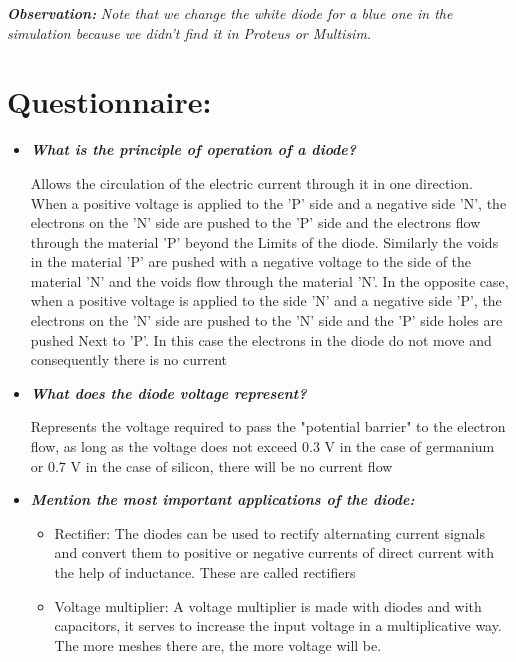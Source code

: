 \documentclass[10pt,a4paper]{article}
\begin{document}
{\bfseries\itshape Observation:} {\itshape Note that we change the white diode for a blue one in the simulation because we didn't find it in Proteus or Multisim.}

\pagebreak

\section{Questionnaire:}

\begin{itemize}
\item {\bfseries\itshape What is the principle of operation of a diode?}

Allows the circulation of the electric current through it in one direction.
When a positive voltage is applied to the 'P' side and a negative side 'N', the electrons on the 'N' side are pushed to the 'P' side and the electrons flow through the material 'P' beyond the Limits of the diode. Similarly the voids in the material 'P' are pushed with a negative voltage to the side of the material 'N' and the voids flow through the material 'N'. In the opposite case, when a positive voltage is applied to the side 'N' and a negative side 'P', the electrons on the 'N' side are pushed to the 'N' side and the 'P' side holes are pushed Next to 'P'. In this case the electrons in the diode do not move and consequently there is no current

\item {\bfseries\itshape What does the diode voltage represent?}

Represents the voltage required to pass the "potential barrier" to the electron flow, as long as the voltage does not exceed 0.3 V in the case of germanium or 0.7 V in the case of silicon, there will be no current flow

\item {\bfseries\itshape Mention the most important applications of the diode:}
\begin{itemize}
\item Rectifier: The diodes can be used to rectify alternating current signals and convert them to positive or negative currents of direct current with the help of inductance. These are called rectifiers

\item Voltage multiplier: A voltage multiplier is made with diodes and with capacitors, it serves to increase the input voltage in a multiplicative way. The more meshes there are, the more voltage will be.


\end{itemize}
\end{itemize}
\end{document}
